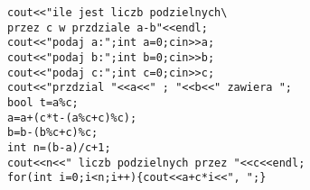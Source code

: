 \begin{verbatim}
cout<<"ile jest liczb podzielnych\
przez c w przdziale a-b"<<endl;  
cout<<"podaj a:";int a=0;cin>>a;
cout<<"podaj b:";int b=0;cin>>b;
cout<<"podaj c:";int c=0;cin>>c;
cout<<"przdzial "<<a<<" ; "<<b<<" zawiera ";
bool t=a%c;
a=a+(c*t-(a%c+c)%c);
b=b-(b%c+c)%c;
int n=(b-a)/c+1;
cout<<n<<" liczb podzielnych przez "<<c<<endl;
for(int i=0;i<n;i++){cout<<a+c*i<<", ";}
\end{verbatim}